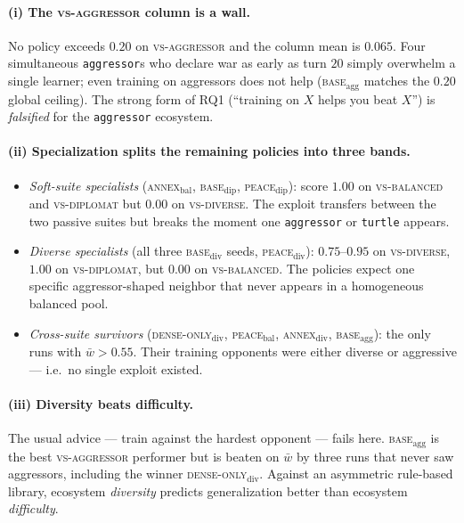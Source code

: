 \documentclass[11pt, a4paper, onecolumn]{article} %
\begin{document}
\paragraph{(i) The \textsc{vs-aggressor} column is a wall.}
No policy exceeds $0.20$ on \textsc{vs-aggressor} and the column mean is
$0.065$. Four simultaneous \texttt{aggressor}s who declare war as early as
turn $20$ simply overwhelm a single learner; even training on aggressors does
not help (\textsc{base}$_{\text{agg}}$ matches the $0.20$ global ceiling).
The strong form of RQ1 (``training on $X$ helps you beat $X$'') is
\emph{falsified} for the \texttt{aggressor} ecosystem.

\paragraph{(ii) Specialization splits the remaining policies into three bands.}
\begin{itemize}
    \item \emph{Soft-suite specialists} (\textsc{annex}$_{\text{bal}}$,
          \textsc{base}$_{\text{dip}}$, \textsc{peace}$_{\text{dip}}$): score
          $1.00$ on \textsc{vs-balanced} and \textsc{vs-diplomat} but $0.00$
          on \textsc{vs-diverse}. The exploit transfers between the two
          passive suites but breaks the moment one \texttt{aggressor} or
          \texttt{turtle} appears.
    \item \emph{Diverse specialists} (all three \textsc{base}$_{\text{div}}$
          seeds, \textsc{peace}$_{\text{div}}$): $0.75$--$0.95$ on
          \textsc{vs-diverse}, $1.00$ on \textsc{vs-diplomat}, but $0.00$ on
          \textsc{vs-balanced}. The policies expect one specific
          aggressor-shaped neighbor that never appears in a homogeneous
          balanced pool.
    \item \emph{Cross-suite survivors}
          (\textsc{dense-only}$_{\text{div}}$, \textsc{peace}$_{\text{bal}}$,
          \textsc{annex}$_{\text{div}}$, \textsc{base}$_{\text{agg}}$): the
          only runs with $\bar{w}>0.55$. Their training opponents were either
          diverse or aggressive --- i.e.\ no single exploit existed.
\end{itemize}

\paragraph{(iii) Diversity beats difficulty.}
The usual advice --- train against the hardest opponent --- fails here.
\textsc{base}$_{\text{agg}}$ is the best \textsc{vs-aggressor} performer but
is beaten on $\bar{w}$ by three runs that never saw aggressors, including the
winner \textsc{dense-only}$_{\text{div}}$. Against an asymmetric rule-based
library, ecosystem \emph{diversity} predicts generalization better than
ecosystem \emph{difficulty}.
\end{document}
